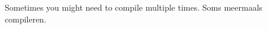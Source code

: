 \documentclass[presentatie.tex]{subfiles}
\begin{document}
\lang
{
    \section{\texorpdfstring{}{Good to know}}
}
{
    \section{\texorpdfstring{}{Goed om te weten}}
}

\clearrecentlist


\begin{frame}
    \lang
    {Sometimes you might need to compile multiple times.}
    {Soms meermaals compileren.}
\end{frame}

\end{document}
